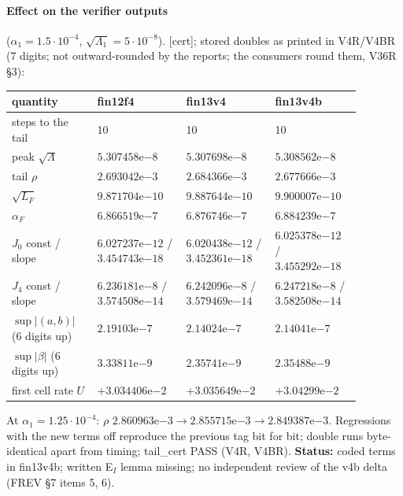 \documentclass[10pt]{article}
\newcommand{\fn}[1]{\texttt{\detokenize{#1}}}
\newcommand{\cert}{\textup{[cert]}}
\begin{document}
\paragraph{Effect on the verifier outputs} ($\alpha_1=1.5\cdot10^{-4}$, $\sqrt{\Lambda_1}=5\cdot10^{-8}$). \cert; stored doubles as printed in V4R/V4BR (7 digits; not outward-rounded by the reports; the consumers round them, V36R \S3):
{\scriptsize
\begin{longtable}{p{0.22\linewidth}p{0.22\linewidth}p{0.22\linewidth}p{0.22\linewidth}}\toprule
quantity & fin12f4 & fin13v4 & fin13v4b\\\midrule\endhead
steps to the tail & 10 & 10 & 10\\
peak $\sqrt\Lambda$ & $5.307458\mathrm{e}{-8}$ & $5.307698\mathrm{e}{-8}$ & $5.308562\mathrm{e}{-8}$\\
tail $\rho$ & $2.693042\mathrm{e}{-3}$ & $2.684366\mathrm{e}{-3}$ & $2.677666\mathrm{e}{-3}$\\
$\sqrt{L_F}$ & $9.871704\mathrm{e}{-10}$ & $9.887644\mathrm{e}{-10}$ & $9.900007\mathrm{e}{-10}$\\
$\alpha_F$ & $6.866519\mathrm{e}{-7}$ & $6.876746\mathrm{e}{-7}$ & $6.884239\mathrm{e}{-7}$\\
$J_0$ const / slope & $6.027237\mathrm{e}{-12}$ / $3.454743\mathrm{e}{-18}$ & $6.020438\mathrm{e}{-12}$ / $3.452361\mathrm{e}{-18}$ & $6.025378\mathrm{e}{-12}$ / $3.455292\mathrm{e}{-18}$\\
$J_4$ const / slope & $6.236181\mathrm{e}{-8}$ / $3.574508\mathrm{e}{-14}$ & $6.242096\mathrm{e}{-8}$ / $3.579469\mathrm{e}{-14}$ & $6.247218\mathrm{e}{-8}$ / $3.582508\mathrm{e}{-14}$\\
$\sup|(a,b)|$ (6 digits up) & $2.19103\mathrm{e}{-7}$ & $2.14024\mathrm{e}{-7}$ & $2.14041\mathrm{e}{-7}$\\
$\sup|\beta|$ (6 digits up) & $3.33811\mathrm{e}{-9}$ & $2.35741\mathrm{e}{-9}$ & $2.35488\mathrm{e}{-9}$\\
first cell rate $U$ & $+3.034406\mathrm{e}{-2}$ & $+3.035649\mathrm{e}{-2}$ & $+3.04299\mathrm{e}{-2}$\\\bottomrule
\end{longtable}}
\noindent At $\alpha_1=1.25\cdot10^{-4}$: $\rho$ $2.860963\mathrm{e}{-3}\to2.855715\mathrm{e}{-3}\to2.849387\mathrm{e}{-3}$. Regressions with the new terms off reproduce the previous tag bit for bit; double runs byte-identical apart from timing; tail\_cert PASS (V4R, V4BR). \textbf{Status:} coded terms in fin13v4b; written E$_I$ lemma \fn{ei_lemma_v4.tex} missing; no independent review of the v4b delta (FREV \S7 items 5, 6).
\end{document}
